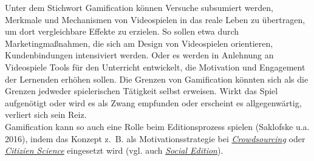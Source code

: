 \documentclass{article}
\begin{document}
        Unter dem Stichwort Gamification können Versuche subsumiert werden, Merkmale und Mechanismen von Videospielen in das reale Leben zu übertragen, um dort vergleichbare Effekte zu erzielen. So sollen etwa durch Marketingmaßnahmen, die sich am Design von Videospielen orientieren, Kundenbindungen intensiviert werden. Oder es werden in Anlehnung an Videospiele Tools für den Unterricht entwickelt, die Motivation und Engagement der Lernenden erhöhen sollen. Die Grenzen von Gamification könnten sich als die Grenzen jedweder spielerischen Tätigkeit selbst erweisen. Wirkt das Spiel aufgenötigt oder wird es als Zwang empfunden oder erscheint es allgegenwärtig, verliert sich sein Reiz.\\
            
        Gamification kann so auch eine Rolle beim Editionsprozess spielen (Saklofske u.a. 2016), indem das Konzept z. B. als Motivationsstrategie bei \emph{\href{http://gams.uni-graz.at/o:konde.47}{Crowdsourcing}} oder \emph{\href{http://gams.uni-graz.at/o:konde.41}{Citizien Science}} eingesetzt wird (vgl. auch \emph{\href{http://gams.uni-graz.at/o:konde.169}{Social Edition}}).\\
            
\end{document}
